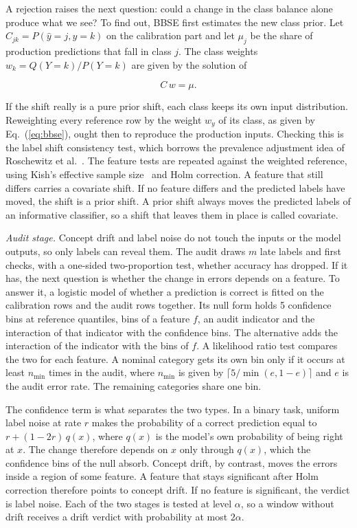 \documentclass[pdflatex,referee,lineno,sn-basic]{sn-jnl}
\begin{document}
A rejection raises the next question: could a change in the class balance alone produce what we see? To find out, BBSE first estimates the new class prior. Let $C_{jk}=P(\hat y=j,y=k)$ on the calibration part and let $\mu_j$ be the share of production predictions that fall in class $j$. The class weights $w_k=Q(Y=k)/P(Y=k)$ are given by the solution of

\begin{equation}
C\,w = \mu.\label{eq:bbse}
\end{equation}

\noindent If the shift really is a pure prior shift, each class keeps its own input distribution. Reweighting every reference row by the weight $w_{y}$ of its class, as given by Eq.~(\ref{eq:bbse}), ought then to reproduce the production inputs. Checking this is the label shift consistency test, which borrows the prevalence adjustment idea of Roschewitz et al.~\citeyearpar{roschewitz2025shiftid}. The feature tests are repeated against the weighted reference, using Kish's effective sample size~\citep{kish1965} and Holm correction. A feature that still differs carries a covariate shift. If no feature differs and the predicted labels have moved, the shift is a prior shift. A prior shift always moves the predicted labels of an informative classifier, so a shift that leaves them in place is called covariate.

\emph{Audit stage.} Concept drift and label noise do not touch the inputs or the model outputs, so only labels can reveal them. The audit draws $m$ late labels and first checks, with a one-sided two-proportion test, whether accuracy has dropped. If it has, the next question is whether the change in errors depends on a feature. To answer it, a logistic model of whether a prediction is correct is fitted on the calibration rows and the audit rows together. Its null form holds 5 confidence bins at reference quantiles, bins of a feature $f$, an audit indicator and the interaction of that indicator with the confidence bins. The alternative adds the interaction of the indicator with the bins of $f$. A likelihood ratio test compares the two for each feature. A nominal category gets its own bin only if it occurs at least $n_{\min}$ times in the audit, where $n_{\min}$ is given by $\lceil 5/\min(e,1-e)\rceil$ and $e$ is the audit error rate. The remaining categories share one bin.

The confidence term is what separates the two types. In a binary task, uniform label noise at rate $r$ makes the probability of a correct prediction equal to $r+(1-2r)\,q(x)$, where $q(x)$ is the model's own probability of being right at $x$. The change therefore depends on $x$ only through $q(x)$, which the confidence bins of the null absorb. Concept drift, by contrast, moves the errors inside a region of some feature. A feature that stays significant after Holm correction therefore points to concept drift. If no feature is significant, the verdict is label noise. Each of the two stages is tested at level $\alpha$, so a window without drift receives a drift verdict with probability at most $2\alpha$.
\end{document}
